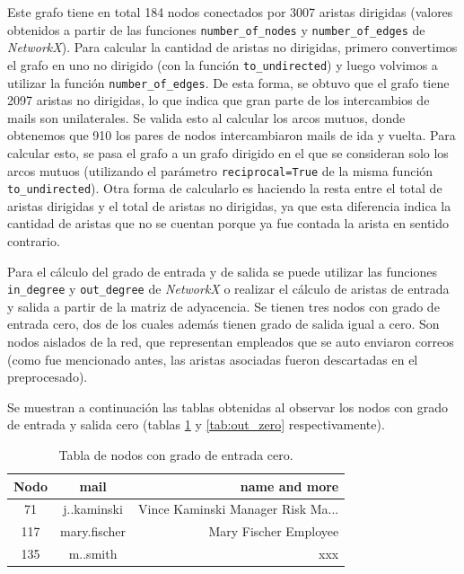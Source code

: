 \documentclass{article}
\begin{document}
Este grafo tiene en total 184 nodos conectados por 3007 aristas dirigidas (valores obtenidos a partir de las funciones \verb|number_of_nodes| y \verb|number_of_edges| de \textit{NetworkX}). Para calcular la cantidad de aristas no dirigidas, primero convertimos el grafo en uno no dirigido (con la función \verb|to_undirected|) y luego volvimos a utilizar la función \verb|number_of_edges|. De esta forma, se obtuvo que el grafo tiene 2097 aristas no dirigidas, lo que indica que gran parte de los intercambios de mails son unilaterales. Se valida esto al calcular los arcos mutuos, donde obtenemos que 910 los pares de nodos intercambiaron mails de ida y vuelta. Para calcular esto, se pasa el grafo a un grafo dirigido en el que se consideran solo los arcos mutuos (utilizando el parámetro \verb|reciprocal=True| de la misma función \verb|to_undirected|). Otra forma de calcularlo es haciendo la resta entre el total de aristas dirigidas y el total de aristas no dirigidas, ya que esta diferencia indica la cantidad de aristas que no se cuentan porque ya fue contada la arista en sentido contrario.

Para el cálculo del grado de entrada y de salida se puede utilizar las funciones \verb|in_degree| y \verb|out_degree| de \textit{NetworkX} o realizar el cálculo de aristas de entrada y salida a partir de la matriz de adyacencia. Se tienen tres nodos con grado de entrada cero, dos de los cuales además tienen grado de salida igual a cero. Son nodos aislados de la red, que representan empleados que se auto enviaron correos (como fue mencionado antes, las aristas asociadas fueron descartadas en el preprocesado).

Se muestran a continuación las tablas obtenidas al observar los nodos con grado de entrada y salida cero (tablas \ref{tab:in_zero} y \ref{tab:out_zero} respectivamente).

\begin{table}[htb]
    \centering
    \begin{tabular}{|c|c|r|}
        \hline
        \textbf{Nodo} & \textbf{mail} & \textbf{name and more}            \\
        \hline
        71            & j..kaminski   & Vince Kaminski Manager Risk Ma... \\
        117           & mary.fischer  & Mary Fischer Employee             \\
        135           & m..smith      & xxx                               \\
        \hline
    \end{tabular}
    \caption{Tabla de nodos con grado de entrada cero.}
    \label{tab:in_zero}
\end{table}
\end{document}
